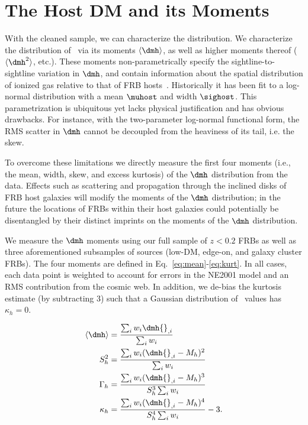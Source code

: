 \section{The Host DM and its Moments}\label{sec:moments}
With the cleaned sample, we can characterize the \dmh distribution. We characterize the distribution of \dmh\ via its moments $\langle \dmh \rangle$, as well as higher moments thereof ($\langle \dmh^2 \rangle$, etc.). These moments non-parametrically specify the sightline-to-sightline variation in $\dmh$, and contain information about the spatial distribution of ionized gas relative to that of FRB hosts~\citep{cordes2016radio, reischke2024analytical}. Historically it has been fit to a log-normal distribution with a mean $\muhost$ and width $\sighost$. This parametrization is ubiquitous \citep[e.g.,][]{macquart2020census,james2021z,baptista2024measuring} yet lacks physical justification and has obvious drawbacks. For instance, with the two-parameter log-normal functional form, the RMS scatter in $\dmh$ cannot be decoupled from the heaviness of its tail, i.e. the skew.

To overcome these limitations we directly measure the first four moments (i.e., the mean, width, skew, and excess kurtosis) of the $\dmh$ distribution from the data. Effects such as scattering and propagation through the inclined disks of FRB host galaxies will modify the moments of the $\dmh$ distribution; in the future the locations of FRBs within their host galaxies could potentially be disentangled by their distinct imprints on the moments of the $\dmh$ distribution.

We measure the $\dmh$ moments using our full sample of $z < 0.2$ FRBs as well as three aforementioned subsamples of sources (low-DM, edge-on, and galaxy cluster FRBs). The four moments are defined in Eq.~\ref{eq:mean}-\ref{eq:kurt}. In all cases, each data point is weighted to account for errors in the NE2001 model and an RMS contribution from the cosmic web. In addition, we de-bias the kurtosis estimate (by subtracting 3) such that a Gaussian distribution of \dmh\ values has $\kappa_h = 0$. %


\begin{align} 
\langle \dmh\rangle &= \dfrac{\sum_i w_i \dmh{}_{,i}}{\sum_i w_i} \label{eq:mean}\\
S_h^2 &= \dfrac{\sum_i w_i (\dmh{}_{,i} - M_h)^2}{\sum_i w_i}\label{eq:std} \\
\Gamma_h &= \dfrac{\sum_i w_i (\dmh{}_{,i} - M_h)^3}{S_h^{3}\sum_i w_i} \label{eq:skew}\\
\kappa_h &= \dfrac{\sum_i w_i (\dmh{}_{,i} - M_h)^4}{S_h^{4}\sum_i w_i} - 3.\label{eq:kurt}
\end{align}

